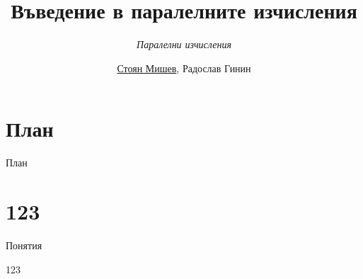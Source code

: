 \documentclass{beamer}
\title{Въведение в паралелните изчисления}
\subtitle{\textit{Паралелни изчисления}}
\author{\newline \newline \underline{Стоян Мишев}, Радослав Гинин}
\date{} %
\begin{document}
\lstset{language=Python}
{ 
\frame{\titlepage}}


\section*{План}\begin{frame}{План}\tableofcontents\end{frame}


\section{123}

\begin{frame}[plain]{Понятия}

\end{frame}


\begin{frame}{123}

\end{frame}

\begin{frame}{}


\end{frame}
\end{document}

